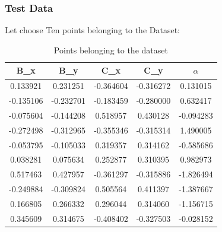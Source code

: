 \documentclass{report}
\begin{document}
            \subsubsection{Test Data}

                Let choose Ten  points belonging to the Dataset: \\
                \begin{table}[h]
                    \centering
                    \begin{tabular}{|c|c|c|c|c|}
                    \hline
                    B\_x & B\_y & C\_x & C\_y & $\alpha$ \\
                    \hline
                    0.133921 & 0.231251 & -0.364604 & -0.316272 & 0.131015 \\
                    -0.135106 & -0.232701 & -0.183459 & -0.280000 & 0.632417 \\
                    -0.075604 & -0.144208 & 0.518957 & 0.430128 & -0.094283 \\
                    -0.272498 & -0.312965 & -0.355346 & -0.315314 & 1.490005 \\
                    -0.053795 & -0.105033 & 0.319357 & 0.314162 & -0.585686 \\
                    0.038281 & 0.075634 & 0.252877 & 0.310395 & 0.982973 \\
                    0.517463 & 0.427957 & -0.361297 & -0.315886 & -1.826494 \\
                    -0.249884 & -0.309824 & 0.505564 & 0.411397 & -1.387667 \\
                    0.166805 & 0.266332 & 0.296044 & 0.314060 & -1.156715 \\
                    0.345609 & 0.314675 & -0.408402 & -0.327503 & -0.028152 \\
                    \hline
                    \end{tabular}
                    \caption{Points belonging to the dataset}
                    \end{table}
            


            \newpage
\end{document}
